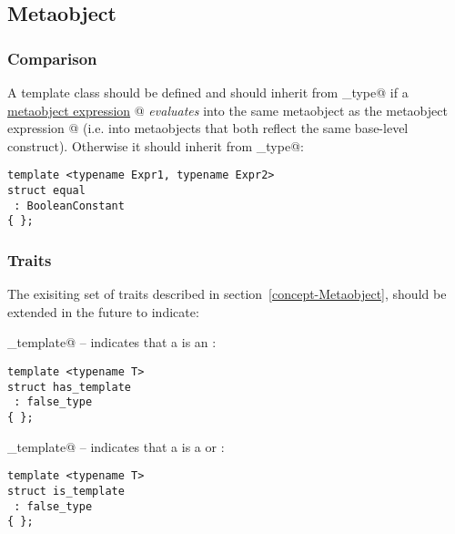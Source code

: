 \subsection{Metaobject}

\subsubsection{Comparison}

A template class \verb@equal@ should be defined and should inherit from \verb@true_type@
if a \hyperref[section-Library]{metaobject expression} @ {\em evaluates} into
the same metaobject as the metaobject expression @ (i.e. into metaobjects
that both reflect the same base-level construct). Otherwise it should inherit from
\verb@false_type@:

\begin{verbatim}
template <typename Expr1, typename Expr2>
struct equal
 : BooleanConstant
{ };
\end{verbatim}

\subsubsection{Traits}

The exisiting set of traits described in section~\ref{concept-Metaobject},
should be extended in the future to indicate:

\verb@has_template@ -- indicates that a  is an :
\begin{verbatim}
template <typename T>
struct has_template
 : false_type
{ };
\end{verbatim}

\verb@is_template@ -- indicates that a  is a 
or :
\begin{verbatim}
template <typename T>
struct is_template
 : false_type
{ };
\end{verbatim}


